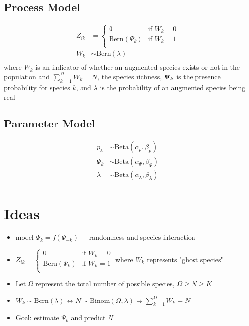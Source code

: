 \documentclass[fleqn]{article}
\def\bm#1{\mbox{\boldmath $#1$}}
\begin{document}
\subsection{Process Model}
%
\begin{align*}
  Z_{ik} & = 
  \begin{cases}
    0 & \mbox{if } W_k = 0\\
    \mbox{Bern}(\Psi_k) & \mbox{if } W_k = 1\\
  \end{cases}\\
  W_k & \sim \mbox{Bern}(\lambda)\\
\end{align*}
%
where $W_k$ is an indicator of whether an augmented species exists or not in the population and $\sum_{k = 1}^\Omega W_k = N$, the species richness, $\bm{\Psi}_k$ is the presence probability for species $k$, and $\lambda$ is the probability of an augmented species being real  
%
\subsection{Parameter Model}
%
\begin{align*}
  p_k & \sim \mbox{Beta}(\alpha_p, \beta_p)\\
  \Psi_k & \sim \mbox{Beta}(\alpha_\Psi, \beta_\Psi)\\
  \lambda & \sim \mbox{Beta}(\alpha_\lambda, \beta_\lambda)\\
\end{align*}
%
\section{Ideas}
%
\begin{itemize}
  \item model $\Psi_k = f(\Psi_{ - k}) +$ randomness and species interaction
  \item $
  Z_{ik}  = 
  \begin{cases}
    0 & \mbox{if } W_k = 0\\
    \mbox{Bern}(\Psi_k) & \mbox{if } W_k = 1\\
  \end{cases}$ where $W_k$ represents "ghost species"
  \item Let $\Omega$ represent the total number of possible species, $\Omega \geq N \geq K$
  \item $W_k \sim \mbox{Bern}(\lambda) \Leftrightarrow N \sim \mbox{Binom}(\Omega, \lambda) \Leftrightarrow \sum_{k = 1}^\Omega W_k = N$
  \item Goal: estimate $\Psi_k$ and predict $N$
\end{itemize}
%
\end{document}
